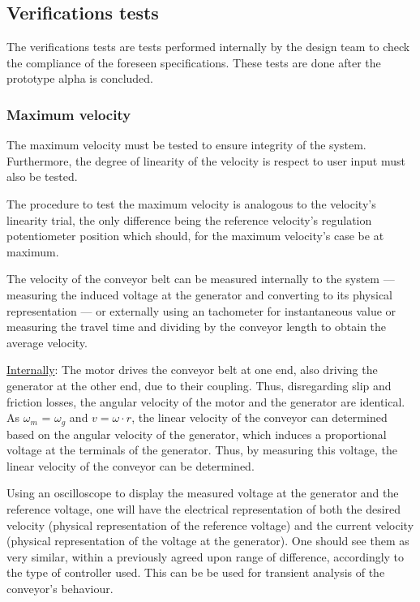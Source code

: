 \documentclass[11pt]{article}
\begin{document}
\subsection{Verifications tests}
\label{sec:orge9c79e2}
The verifications tests are tests performed internally by the design team to
check the compliance of the foreseen specifications. These tests are done after
the prototype alpha is concluded.

\subsubsection{Maximum velocity}
\label{sec:org532616f}
The maximum velocity must be tested to ensure integrity of the
system. Furthermore, the degree of linearity of the velocity is respect to user
input must also be tested.

The procedure to test the maximum velocity is analogous to the velocity's
linearity trial, the only difference being the reference velocity’s regulation potentiometer position which should, for the maximum velocity’s case be at maximum.

The velocity of the conveyor belt can be measured internally to the system ---
measuring the induced voltage at the generator and converting to its physical
representation --- or externally using an tachometer for instantaneous value or
measuring the travel time and dividing by the conveyor length to obtain the
average velocity.

\uline{Internally}: The motor drives the conveyor belt at one end, also driving the
generator at the other end, due to their coupling. Thus, disregarding slip and
friction losses, the angular velocity of the motor and the generator are
identical. As \(\omega_m\) = \(\omega_g\) and \(v = \omega \cdot r\), the linear velocity of the conveyor can determined based on the angular velocity of the generator, which induces a proportional voltage at the terminals of the generator. Thus, by measuring this voltage, the linear velocity of the conveyor can be determined.

Using an oscilloscope to display the measured voltage at the generator and the
reference voltage, one will have the electrical representation of both the
desired velocity (physical representation of the reference voltage) and the
current velocity (physical representation of the voltage at the generator). 
One should see them as very similar, within a previously agreed upon range of
difference, accordingly to the type of controller used. This can be be used for
transient analysis of the conveyor's behaviour.
\end{document}
